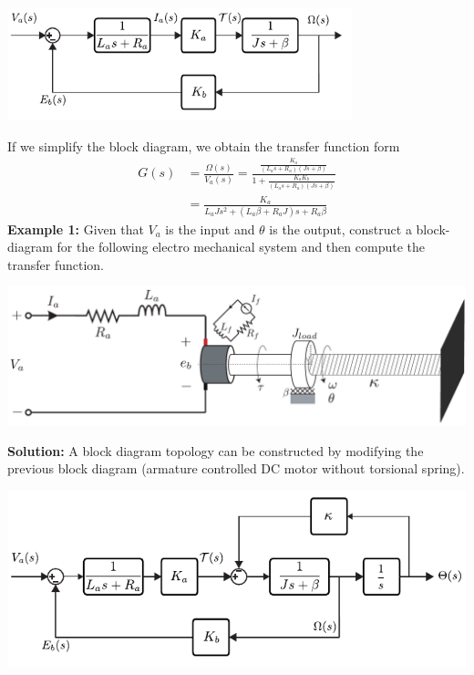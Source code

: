 \documentclass[twoside]{article}
\begin{document}
  \begin{minipage}[h]{1\linewidth}
    \begin{center}
      \includegraphics[width=0.75\textwidth]{arm_block}
    \end{center}
  \end{minipage} 
  
  If we simplify the block diagram, we obtain the transfer function form
   \begin{align*}
   	G(s) &= \frac{\Omega(s)}{V_a(s)} = \frac{\frac{K_a}{(L_a s + R_a) (J s + \beta)} }{1 + \frac{K_a K_b}{(L_a s + R_a) (J s + \beta)}}
	\\
	&= \frac{K_a}{L_a J s^2 + ( L_a \beta + R_a J ) s + R_a \beta}
   \end{align*}
   \textbf{Example 1:} Given that $V_a$ is the input and $\theta$ is the output, construct a block-diagram for the following electro mechanical system and then compute the transfer function.
  
    \begin{minipage}[h]{1\linewidth}
    \begin{center}
      \includegraphics[width=1\textwidth]{DC_Mot_ex1}
    \end{center}
  \end{minipage} 
  
    \textbf{Solution:} A block diagram topology can be constructed by modifying the previous block diagram (armature controlled DC motor without torsional spring).
  
    \begin{minipage}[h]{1\linewidth}
    \begin{center}
      \includegraphics[width=1\textwidth]{block_ex1}
    \end{center}
  \end{minipage} 
  
\end{document}
